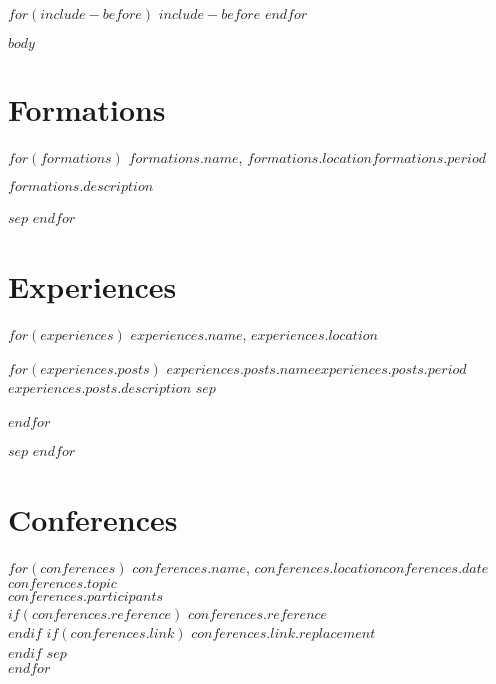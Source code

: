 \documentclass[
$if(fontsize)$
    $fontsize$,
$endif$
$if(lang)$
    $babel-lang$,
$endif$
$if(papersize)$
    $papersize$paper,
$endif$
$for(classoption)$
    $classoption$$sep$,
$endfor$
]{$documentclass$}
\newcommand{\mhref}[2]{\href{#2}{\texttt{#1}}}
\begin{document}
$for(include-before)$
    $include-before$
$endfor$

$body$

\section{Formations}
\footnotesize
\begin{adjustwidth}{3cm}{0cm}
    $for(formations)$
    \textbf{$formations.name$}, $formations.location$\hfill \textit{$formations.period$}
        \begin{adjustwidth}{0.6cm}{0cm}
            $formations.description$
        \end{adjustwidth}
        $sep$\vspace{0.8cm}
    $endfor$
\end{adjustwidth}

\section{Experiences}
\footnotesize
\begin{adjustwidth}{3cm}{0cm}
    $for(experiences)$
    \textbf{$experiences.name$}, $experiences.location$
        \begin{adjustwidth}{0.6cm}{0cm}
            $for(experiences.posts)$
                \textit{$experiences.posts.name$}\hfill \textit{$experiences.posts.period$}\\
                $experiences.posts.description$
                $sep$\\\\
            $endfor$
        \end{adjustwidth}
        $sep$\vspace{0.8cm}
    $endfor$
\end{adjustwidth}

\section{Conferences}
\footnotesize
\begin{adjustwidth}{3cm}{0cm}
    $for(conferences)$
    \textbf{$conferences.name$}, $conferences.location$\hfill \textit{$conferences.date$}\\
        $conferences.topic$\\
        \textit{$conferences.participants$}\\
        $if(conferences.reference)$
            $conferences.reference$\\
        $endif$
        $if(conferences.link)$
            \mhref{$conferences.link.replacement$}{$conferences.link.url$}\\
        $endif$
        $sep$\\
    $endfor$
\end{adjustwidth}
\end{document}

